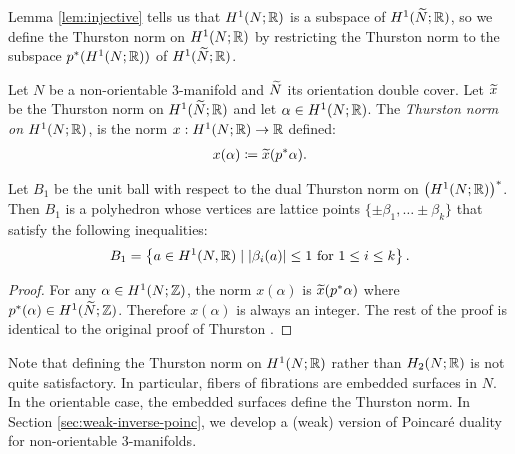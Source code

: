 Lemma \ref{lem:injective} tells us that $H^1(N; \mathbb{R})$ is a subspace of $H^1(\widetilde{N}; \mathbb{R})$, so we define the Thurston norm on $H^1(N; \mathbb{R})$ by restricting the Thurston norm to the subspace $p^*(H^1(N;\mathbb{R}))$ of $H^1(\widetilde{N};\mathbb{R})$.

  Let $N$ be a non-orientable 3-manifold and $\widetilde{N}$ its orientation double cover.  Let $\widetilde{x}$ be the Thurston norm on $H^1(\widetilde{N};\mathbb{R})$ and let $\alpha \in H^1(N;\mathbb{R})$.
  The \emph{Thurston norm on $H^1(N; \mathbb{R})$}, is the norm $x: H^1(N;\mathbb{R}) \rightarrow \mathbb{R}$ defined:
  \begin{align*}
    x(\alpha) \coloneqq \widetilde{x}(p^{\ast}\alpha).
  \end{align*}

\begin{thm}
  Let $B_1$ be the unit ball with respect to the dual Thurston norm on $\left( H^1(N; \mathbb{R}) \right)^{\ast}$.  Then $B_1$ is a polyhedron whose vertices are lattice points $\{\pm \beta_1, \ldots \pm \beta_k\}$ that satisfy the following inequalities:
  \begin{align*}
    B_1 = \left\{ a\in H^1(N,\mathbb{R}) \mid \left| \beta_i(a) \right| \leq 1 \text{ for $1\leq i \leq k$} \right\}.
  \end{align*}
\end{thm}

\begin{proof}
  For any $\alpha\in H^1(N; \mathbb{Z})$, the norm $x(\alpha)$ is $\widetilde{x}(p^\ast\alpha)$ where $p^\ast(\alpha)\in H^1(\widetilde{N};\mathbb{Z})$.  Therefore $x(\alpha)$ is always an integer.
  The rest of the proof is identical to the original proof of Thurston \cite[Theorem 2]{thurston1986norm}.
\end{proof}

Note that defining the Thurston norm on $H^1(N; \mathbb{R})$ rather than $H_2(N; \mathbb{R})$ is not quite satisfactory.
In particular, fibers of fibrations are embedded surfaces in $N$.  In the orientable case, the embedded surfaces define the Thurston norm.
In Section \ref{sec:weak-inverse-poinc}, we develop a (weak) version of Poincar\'e duality for non-orientable 3-manifolds.%

